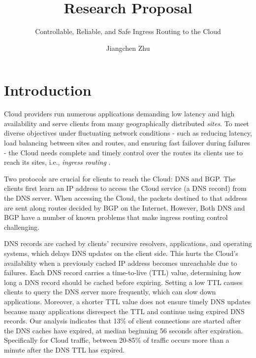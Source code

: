 \documentclass[sigconf,nonacm,screen,letterpaper,10pt]{acmart}
\title{Research Proposal}
\subtitle{Controllable, Reliable, and Safe Ingress Routing to the Cloud}
\author{Jiangchen Zhu}
\affiliation{\institution{Columbia University}}
\date{}
\begin{document}

\maketitle


\setlength{\footskip}{40pt}

\hypertarget{introduction}{%
\section{Introduction}\label{introduction}}

Cloud providers run numerous applications demanding low latency and high
availability and serve clients from many geographically distributed
\textit{sites}. To meet diverse objectives under fluctuating network
conditions - such as reducing latency, load balancing between sites and
routes, and ensuring fast failover during failures - the Cloud needs
complete and timely control over the routes its clients use to reach its
sites, i.e., \textit{ingress routing} .

Two protocols are crucial for clients to reach the Cloud: DNS and BGP.
The clients first learn an IP address to access the Cloud service (a DNS
record) from the DNS server. When accessing the Cloud, the packets
destined to that address are sent along routes decided by BGP on the
Internet. However, Both DNS and BGP have a number of known problems that
make ingress routing control challenging.

DNS records are cached by clients' recursive resolvers, applications,
and operating systems, which delays DNS updates on the client side. This
hurts the Cloud's availability when a previously cached IP address
becomes unreachable due to failures. Each DNS record carries a
time-to-live (TTL) value, determining how long a DNS record should be
cached before expiring. Setting a low TTL causes clients to query the
DNS server more frequently, which can slow down applications. Moreover,
a shorter TTL value does not ensure timely DNS updates because many
applications disrespect the TTL and continue using expired DNS records.
Our analysis indicates that 13\% of client connections are started after
the DNS caches have expired, at median beginning 56 seconds after
expiration. Specifically for Cloud traffic, between 20-85\% of traffic
occurs more than a minute after the DNS TTL has expired.
\end{document}

